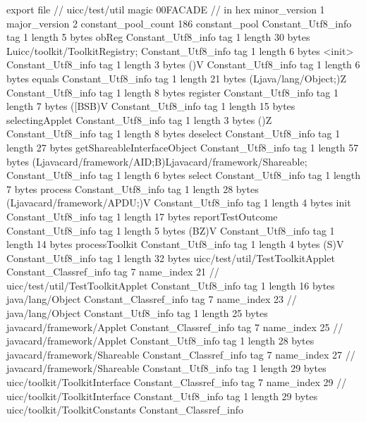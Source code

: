export file {		// uicc/test/util
	magic	00FACADE		 // in hex
	minor_version	1
	major_version	2
	constant_pool_count	186
	constant_pool {
		Constant_Utf8_info {
			tag	1
			length	5
			bytes	obReg
		}
		Constant_Utf8_info {
			tag	1
			length	30
			bytes	Luicc/toolkit/ToolkitRegistry;
		}
		Constant_Utf8_info {
			tag	1
			length	6
			bytes	<init>
		}
		Constant_Utf8_info {
			tag	1
			length	3
			bytes	()V
		}
		Constant_Utf8_info {
			tag	1
			length	6
			bytes	equals
		}
		Constant_Utf8_info {
			tag	1
			length	21
			bytes	(Ljava/lang/Object;)Z
		}
		Constant_Utf8_info {
			tag	1
			length	8
			bytes	register
		}
		Constant_Utf8_info {
			tag	1
			length	7
			bytes	([BSB)V
		}
		Constant_Utf8_info {
			tag	1
			length	15
			bytes	selectingApplet
		}
		Constant_Utf8_info {
			tag	1
			length	3
			bytes	()Z
		}
		Constant_Utf8_info {
			tag	1
			length	8
			bytes	deselect
		}
		Constant_Utf8_info {
			tag	1
			length	27
			bytes	getShareableInterfaceObject
		}
		Constant_Utf8_info {
			tag	1
			length	57
			bytes	(Ljavacard/framework/AID;B)Ljavacard/framework/Shareable;
		}
		Constant_Utf8_info {
			tag	1
			length	6
			bytes	select
		}
		Constant_Utf8_info {
			tag	1
			length	7
			bytes	process
		}
		Constant_Utf8_info {
			tag	1
			length	28
			bytes	(Ljavacard/framework/APDU;)V
		}
		Constant_Utf8_info {
			tag	1
			length	4
			bytes	init
		}
		Constant_Utf8_info {
			tag	1
			length	17
			bytes	reportTestOutcome
		}
		Constant_Utf8_info {
			tag	1
			length	5
			bytes	(BZ)V
		}
		Constant_Utf8_info {
			tag	1
			length	14
			bytes	processToolkit
		}
		Constant_Utf8_info {
			tag	1
			length	4
			bytes	(S)V
		}
		Constant_Utf8_info {
			tag	1
			length	32
			bytes	uicc/test/util/TestToolkitApplet
		}
		Constant_Classref_info {
			tag	7
			name_index	21		// uicc/test/util/TestToolkitApplet
		}
		Constant_Utf8_info {
			tag	1
			length	16
			bytes	java/lang/Object
		}
		Constant_Classref_info {
			tag	7
			name_index	23		// java/lang/Object
		}
		Constant_Utf8_info {
			tag	1
			length	25
			bytes	javacard/framework/Applet
		}
		Constant_Classref_info {
			tag	7
			name_index	25		// javacard/framework/Applet
		}
		Constant_Utf8_info {
			tag	1
			length	28
			bytes	javacard/framework/Shareable
		}
		Constant_Classref_info {
			tag	7
			name_index	27		// javacard/framework/Shareable
		}
		Constant_Utf8_info {
			tag	1
			length	29
			bytes	uicc/toolkit/ToolkitInterface
		}
		Constant_Classref_info {
			tag	7
			name_index	29		// uicc/toolkit/ToolkitInterface
		}
		Constant_Utf8_info {
			tag	1
			length	29
			bytes	uicc/toolkit/ToolkitConstants
		}
		Constant_Classref_info {
}}}
